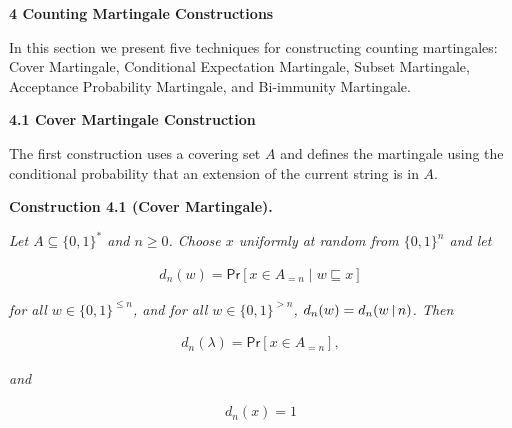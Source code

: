 





\par\medskip\noindent\textbf{
4 Counting Martingale Constructions}\par




In this section we present five techniques for constructing counting martingales: Cover Martingale, Conditional Expectation Martingale, Subset Martingale, Acceptance Probability Martingale, and Bi-immunity Martingale.\par




\par\medskip\noindent\textbf{
4.1 Cover Martingale Construction}\par




The first construction uses a covering set $A$ and defines the martingale using the conditional probability that an extension of the current string is in $A$.\par





\par\medskip\noindent\textbf{
\textbf{Construction 4.1}\textbf{ }(Cover Martingale)\textbf{.}
}\par



\emph{Let
$A\subseteq\{0,1\}^{*}$ and $n\geq 0$.
Choose $x$ uniformly at random from $\{0,1\}^{n}$ and let}\par


\[\begin{gathered}
d_{n}(w)=\mathsf{Pr}[x\in A_{=n}\mid w\sqsubseteq x]
\end{gathered}\]


\emph{for all $w\in\{0,1\}^{\leq n}$, and for all $w\in\{0,1\}^{>n}$, $d_{n}(w)=d_{n}(w\negthinspace\upharpoonright\negthinspace n)$.
Then}\par


\[\begin{gathered}
d_{n}(\lambda)=\mathsf{Pr}[x\in A_{=n}],
\end{gathered}\]


\emph{and}\par


\[\begin{gathered}
d_{n}(x)=1
\end{gathered}\]


